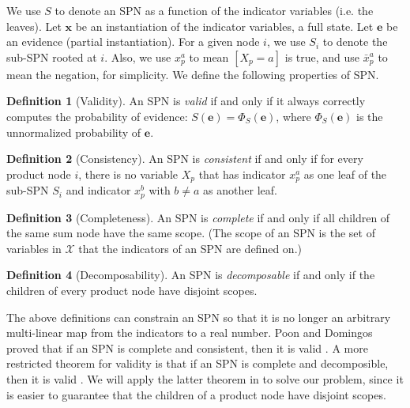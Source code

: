 \documentclass[11pt, titlepage]{article}
\theoremstyle{definition}
\newtheorem{definition}{Definition}[section]
\newcommand\mb{\mathbf}
\begin{document}
We use $S$ to denote an SPN as a function of the indicator variables (i.e. the leaves). Let $\mb{x}$ be an instantiation of the indicator variables, a full state. Let $\mb{e}$ be an evidence (partial instantiation). For a given node $i$, we use $S_i$ to denote the sub-SPN rooted at $i$. Also, we use $x_{p}^a$ to mean $[X_p=a]$ is true, and use $\bar{x}_p^a$ to mean the negation, for simplicity. We define the following properties of SPN.

\begin{definition}[Validity]
An SPN is \textit{valid} if and only if it always correctly computes the probability of evidence: $S(\mb{e})=\Phi_S(\mb{e})$, where $\Phi_S(\mb{e})$ is the unnormalized probability of $\mb{e}$.
\end{definition}

\begin{definition}[Consistency]
An SPN is \textit{consistent} if and only if for every product node $i$, there is no variable $X_p$ that has indicator $x_p^a$ as one leaf of the sub-SPN $S_i$ and indicator $x_p^b$ with $b\neq a$ as another leaf.
\end{definition}

\begin{definition}[Completeness]
An SPN is \textit{complete} if and only if all children of the same sum node have the same scope. (The scope of an SPN is the set of variables in $\mathcal{X}$ that the indicators of an SPN are defined on.)
\end{definition}

\begin{definition}[Decomposability]
An SPN is \textit{decomposable} if and only if the children of every product node have disjoint scopes.
\end{definition}

The above definitions can constrain an SPN so that it is no longer an arbitrary multi-linear map from the indicators to a real number. Poon and Domingos proved that if an SPN is complete and consistent, then it is valid \cite{poon2011sum}. A more restricted theorem for validity is that if an SPN is complete and decomposible, then it is valid \cite{peharz2015theoretical}. We will apply the latter theorem in to solve our problem, since it is easier to guarantee that the children of a product node have disjoint scopes.
\end{document}
